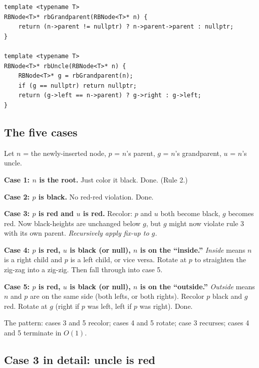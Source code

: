 \documentclass[11pt]{article}
\begin{document}
\begin{lstlisting}
template <typename T>
RBNode<T>* rbGrandparent(RBNode<T>* n) {
    return (n->parent != nullptr) ? n->parent->parent : nullptr;
}

template <typename T>
RBNode<T>* rbUncle(RBNode<T>* n) {
    RBNode<T>* g = rbGrandparent(n);
    if (g == nullptr) return nullptr;
    return (g->left == n->parent) ? g->right : g->left;
}
\end{lstlisting}

\subsection*{The five cases}

Let $n$ = the newly-inserted node, $p$ = $n$'s parent, $g$ = $n$'s grandparent, $u$ = $n$'s uncle.

\textbf{Case 1: $n$ is the root.} Just color it black. Done. (Rule 2.)

\textbf{Case 2: $p$ is black.} No red-red violation. Done.

\textbf{Case 3: $p$ is red and $u$ is red.} Recolor: $p$ and $u$ both become black, $g$ becomes red. Now black-heights are unchanged below $g$, but $g$ might now violate rule 3 with its own parent. \emph{Recursively apply fix-up to $g$.}

\textbf{Case 4: $p$ is red, $u$ is black (or null), $n$ is on the ``inside.''} \emph{Inside} means $n$ is a right child and $p$ is a left child, or vice versa. Rotate at $p$ to straighten the zig-zag into a zig-zig. Then fall through into case 5.

\textbf{Case 5: $p$ is red, $u$ is black (or null), $n$ is on the ``outside.''} \emph{Outside} means $n$ and $p$ are on the same side (both lefts, or both rights). Recolor $p$ black and $g$ red. Rotate at $g$ (right if $p$ was left, left if $p$ was right). Done.

The pattern: cases 3 and 5 recolor; cases 4 and 5 rotate; case 3 recurses; cases 4 and 5 terminate in $O(1)$.

\subsection*{Case 3 in detail: uncle is red}
\end{document}
